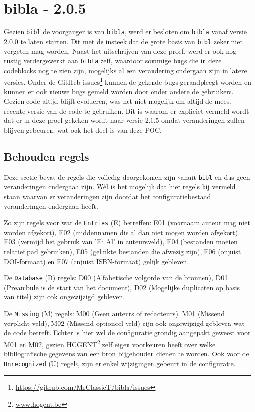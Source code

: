 \section{bibla - 2.0.5}
\label{sec:bibla205}
Gezien \texttt{bibl} de voorganger is van \texttt{bibla}, werd er besloten om \texttt{bibla} vanaf versie 2.0.0 te laten starten. Dit met de insteek dat de grote basis van \texttt{bibl} zeker niet vergeten mag worden. Naast het uitschrijven van deze proef, werd er ook nog rustig verdergewerkt aan \texttt{bibla} zelf, waardoor sommige bugs die in deze codeblocks nog te zien zijn, mogelijks al een verandering ondergaan zijn in latere versies. Onder de GitHub-issues\footnote{\url{https://github.com/MrClassicT/bibla/issues}} kunnen de gekende bugs geraadpleegt worden en kunnen er ook nieuwe bugs gemeld worden door onder andere de gebruikers. Gezien code altijd blijft evolueren, was het niet mogelijk om altijd de meest recente versie van de code te gebruiken. Dit is waarom er expliciet vermeld wordt dat er in deze proef gekeken wordt naar versie 2.0.5 omdat veranderingen zullen blijven gebeuren; wat ook het doel is van deze \acrshort{POC}.

\subsection{Behouden regels}
Deze sectie bevat de regels die volledig doorgekomen zijn vanuit \texttt{bibl} en dus geen veranderingen ondergaan zijn. Wèl is het mogelijk dat hier regels bij vermeld staan waarvan er veranderingen zijn doordat het configuratiebestand veranderingen ondergaan heeft.

Zo zijn regels voor wat de \texttt{Entries} (E) betreffen: E01 (voornaam auteur mag niet worden afgekort), E02 (middennamen die al dan niet mogen worden afgekort), E03 (vermijd het gebruik van 'Et Al' in auteursveld), E04 (bestanden moeten relatief pad gebruiken), E05 (gelinkte bestanden die afwezig zijn), E06 (onjuist DOI-formaat) en E07 (onjuist ISBN-formaat) gelijk gebleven. 

De \texttt{Database} (D) regels: D00 (Alfabetische volgorde van de bronnen), D01 (Preambule is de start van het document), D02 (Mogelijke duplicaten op basis van titel) zijn ook ongewijzigd gebleven.

De \texttt{Missing} (M) regels: M00 (Geen auteurs of redacteurs), M01 (Missend verplicht veld), M02 (Missend optioneel veld) zijn ook ongewijzigd gebleven wat de code betreft. Echter is hier wel de configuratie grondig aangepakt geweest voor M01 en M02, gezien HOGENT\footnote{\url{www.hogent.be}} zelf eigen voorkeuren heeft over welke bibliografische gegevens van een bron bijgehouden dienen te worden. Ook voor de \texttt{Unrecognized} (U) regels, zijn er enkel wijzigingen gebeurt in de configuratie. 


